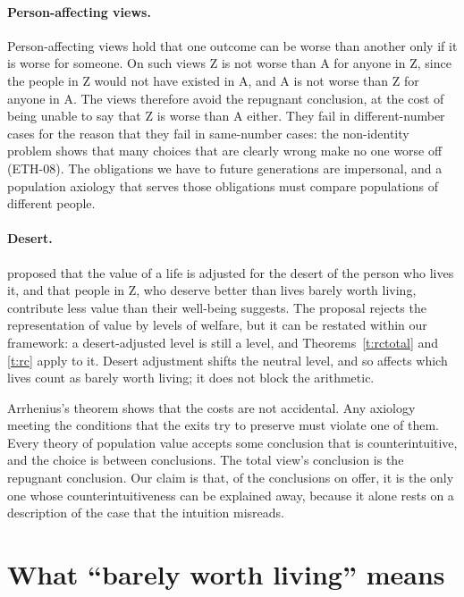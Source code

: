 \documentclass{situationist-preprint}
\begin{document}
\paragraph{Person-affecting views.} Person-affecting views hold that one outcome can be worse than another only if it is worse for someone. On such views Z is not worse than A for anyone in Z, since the people in Z would not have existed in A, and A is not worse than Z for anyone in A. The views therefore avoid the repugnant conclusion, at the cost of being unable to say that Z is worse than A either. They fail in different-number cases for the reason that they fail in same-number cases: the non-identity problem shows that many choices that are clearly wrong make no one worse off (ETH-08). The obligations we have to future generations are impersonal, and a population axiology that serves those obligations must compare populations of different people.

\paragraph{Desert.} \citet{Feldman1995} proposed that the value of a life is adjusted for the desert of the person who lives it, and that people in Z, who deserve better than lives barely worth living, contribute less value than their well-being suggests. The proposal rejects the representation of value by levels of welfare, but it can be restated within our framework: a desert-adjusted level is still a level, and Theorems~\ref{t:rctotal} and \ref{t:rc} apply to it. Desert adjustment shifts the neutral level, and so affects which lives count as barely worth living; it does not block the arithmetic.

Arrhenius's theorem shows that the costs are not accidental. Any axiology meeting the conditions that the exits try to preserve must violate one of them. Every theory of population value accepts some conclusion that is counterintuitive, and the choice is between conclusions. The total view's conclusion is the repugnant conclusion. Our claim is that, of the conclusions on offer, it is the only one whose counterintuitiveness can be explained away, because it alone rests on a description of the case that the intuition misreads.

\section{What ``barely worth living'' means}\label{s:barely}
\end{document}
